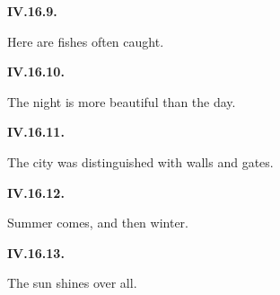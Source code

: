 \par\begin{minipage}{\linewidth}\raggedright
\textbf{IV.16.9.}

Here are fishes often caught.

\end{minipage}\par\addvspace{4pt}

\par\begin{minipage}{\linewidth}\raggedright
\textbf{IV.16.10.}

The night is more beautiful than the day.

\end{minipage}\par\addvspace{4pt}

\par\begin{minipage}{\linewidth}\raggedright
\textbf{IV.16.11.}

The city was distinguished with walls and gates.

\end{minipage}\par\addvspace{4pt}

\par\begin{minipage}{\linewidth}\raggedright
\textbf{IV.16.12.}

Summer comes, and then winter.

\end{minipage}\par\addvspace{4pt}

\par\begin{minipage}{\linewidth}\raggedright
\textbf{IV.16.13.}

The sun shines over all.

\end{minipage}\par\addvspace{4pt}

